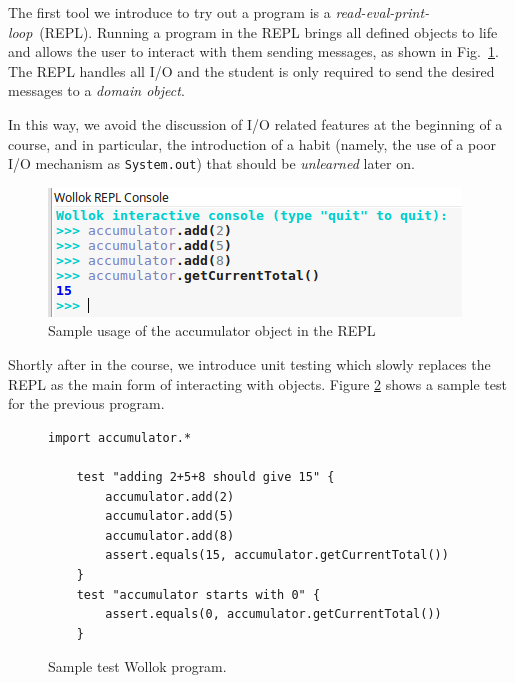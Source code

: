 The first tool we introduce to try out a program 
is a \emph {read-eval-print-loop}~(REPL). Running a program in the REPL brings all defined objects to life and allows the user to interact with them sending messages, as shown in Fig.~\ref{fig:repl}. 
The REPL handles all I/O and the student is only required to send the desired messages to a \emph{domain object}.

In this way, we avoid the discussion of I/O related features at the beginning of a course, and in particular, the introduction of a habit (namely, the use of a poor I/O mechanism as \texttt{System.out}) that should be \emph{unlearned} later on.


\begin{figure}[ht]
 \centering
 \includegraphics[scale=0.6]{../images/accumulator-repl.png}
 \caption{\small Sample usage of the accumulator object in the REPL}
 \label{fig:repl}
\end{figure}
\vspace{-1mm}




Shortly after in the course, we introduce unit testing which slowly replaces the REPL as the main form of interacting with objects. Figure \ref{fig:test} shows a sample test for the previous program. 
\vspace{-5mm}

\begin{figure}[ht]
 \centering
 \begin{lstlisting}[language=Wollok]
 	import accumulator.*

	test "adding 2+5+8 should give 15" {
		accumulator.add(2)
		accumulator.add(5)
		accumulator.add(8)
		assert.equals(15, accumulator.getCurrentTotal())		
	}
	test "accumulator starts with 0" {
		assert.equals(0, accumulator.getCurrentTotal())
	}\end{lstlisting}
\vspace{-3mm}
\caption{\small Sample test Wollok program.}
\label{fig:test}
\end{figure}

